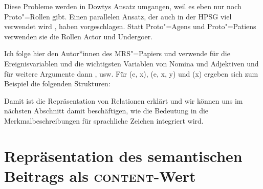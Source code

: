 Diese Probleme werden in Dowtys Ansatz umgangen, weil es eben nur noch Proto"=Rollen gibt. Einen
parallelen Ansatz, der auch in der HPSG viel verwendet wird \citep*{Davis2001a-u,KD2003a-u,DKW2024a}, haben \citet{VanVL97a-u}
vorgeschlagen. Statt Proto"=Agens und Proto"=Patiens verwenden sie die Rollen Actor und Undergoer.

Ich folge hier den Autor*innen des MRS"=Papiers und verwende für die Ereignisvariablen und die
wichtigsten Variablen von Nomina und Adjektiven \argzero und für weitere Argumente dann \argone,
\argtwo usw. Für (e, x), (e, x, y) und (x) ergeben sich zum Beispiel die folgenden Strukturen:
\eal
\ex
{}
\ex
{}
\zl

\ea
{}
\z
Damit ist die Repräsentation von Relationen erklärt und wir können uns im nächsten Abschnitt damit
beschäftigen, wie die Bedeutung in die Merkmalbeschreibungen für sprachliche Zeichen integriert wird.


\section{Repräsentation des semantischen Beitrags als \textsc{content}-Wert}
\label{sec-CONT}


